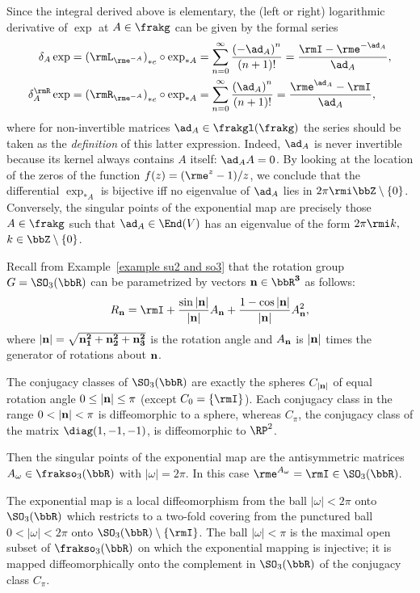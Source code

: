 \begin{rem}
    Since the integral derived above is elementary, the (left or right) logarithmic derivative of $\exp$ at $A\in\frakg$ can be given by the formal series
    \[\begin{aligned}
        \delta_A\exp= \left(\rmL_{\rme^{-A}}\right)_{\ast e}\circ \exp_{\ast A}&=\sum_{n=0}^\infty \frac{\left(-\ad_{A}\right)^n}{(n+1)!}=\frac{\rmI-\rme^{-\ad_A}}{\ad_A},\\
        \delta^\rmR_A\exp= \left(\rmR_{\rme^{-A}}\right)_{\ast e}\circ \exp_{\ast A}&=\sum_{n=0}^\infty \frac{\left(\ad_{A}\right)^n}{(n+1)!}=\frac{\rme^{\ad_A}-\rmI}{\ad_A},
    \end{aligned}\label{dexp series}\]
    where for non-invertible matrices $\ad_A\in\frakgl(\frakg)$ the series should be taken as the \emph{definition} of this latter expression. Indeed, $\ad_A$ is never invertible because its kernel always contains $A$ itself: $\ad_A A=0$. By looking at the location of the zeros of the function $f(z)=(\rme^z-1)/z$, we conclude that the differential $\exp_{\ast A}$ is bijective iff no eigenvalue of $\ad_A$ lies in $2\pi \rmi\bbZ\setminus\{0\}$. Conversely, the singular points of the exponential map are precisely those $A\in \frakg$ such that $\ad_A\in \End(V)$ has an eigenvalue of the form $2\pi \rmi k,$ $k\in\bbZ\setminus\{0\}$.
\end{rem}

\begin{example}
    Recall from Example~\ref{example su2 and so3} that the rotation group $G=\SO_3(\bbR)$ can be parametrized by vectors $\bf{n}\in\bbR^3$ as follows:
    \[R_{\bf{n}}=\rmI+\frac{\sin |\bf{n}|}{|\bf{n}|}A_{\bf{n}}+\frac{1-\cos |\bf{n}|}{|\bf{n}|}A_{\bf{n}}^2,\]
    where $|\bf{n}|=\sqrt{n_1^2+n_2^2+n_3^2}$ is the rotation angle and $A_{\bf n}$ is $|\bf n|$ times the generator of rotations about $\bf n$.

    The conjugacy classes of $\SO_3(\bbR)$ are exactly the spheres $C_{|\bf{n}|}$ of equal rotation angle $0\leq |\bf{n}|\leq \pi$ (except $C_0=\{\rmI\}$). Each conjugacy class in the range $0<|\bf{n}|<\pi$ is diffeomorphic to a sphere, whereas $C_\pi$, the conjugacy class of the matrix $\diag(1,-1,-1)$, is diffeomorphic to $\RP^2$.
    
    Then the singular points of the exponential map are the antisymmetric matrices $A_\omega\in \frakso_3(\bbR)$ with $|\omega|=2\pi$. In this case $\rme^{A_\omega}=\rmI\in \SO_3(\bbR)$. 

    The exponential map is a local diffeomorphism from the ball $|\omega|<2\pi$ onto $\SO_3(\bbR)$ which restricts to a two-fold covering from the punctured ball $0<|\omega|<2\pi$ onto $\SO_3(\bbR)\setminus \{\rmI\}$. The ball $|\omega|<\pi$ is the maximal open subset of $\frakso_3(\bbR)$ on which the exponential mapping is injective; it is mapped diffeomorphically onto the complement in $\SO_3(\bbR)$ of the conjugacy class $C_\pi$.
\end{example}


